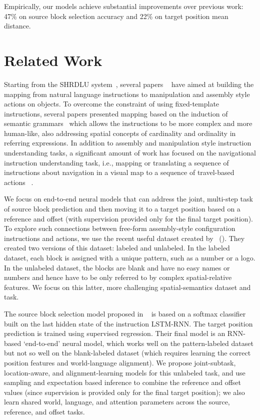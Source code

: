 \documentclass[letterpaper]{article} %
\newcommand{\newcite}[1]{\citeauthor{#1} (\citeyear{#1})}
\begin{document}
Empirically, our models achieve substantial improvements over previous work: 47\% on source block selection accuracy and 22\% on target position mean distance.

\section{Related Work}


Starting from the SHRDLU system~\cite{winograd72}, several papers ~\cite{branavan2009reinforcement,howard2014natural,matuszek2014learning} have aimed at building the mapping from natural language instructions to manipulation and assembly style actions on objects.
To overcome the constraint of using fixed-template instructions, several papers presented mapping based on the induction of semantic grammars~\cite{zettlemoyer2005learning,tellex2011understanding,matuszek2012joint,misra2015environment,paul2016efficient} which allows the instructions to be more complex and more human-like, also addressing spatial concepts of cardinality and ordinality in referring expressions.
%
In addition to assembly and manipulation style instruction understanding tasks, a significant amount of work has focused on the navigational instruction understanding task, i.e., mapping or translating a sequence of instructions about navigation in a visual map to a sequence of travel-based actions~\cite{chen2011learning,artzi2013weakly,mei2015listen,andreas2015alignment} .

We focus on end-to-end neural models that can address the joint, multi-step task of source block prediction and then moving it to a target position based on a reference and offset (with supervision provided only for the final target position). To explore such connections between free-form assembly-style configuration instructions and  actions, we use the recent useful dataset created by~\newcite{bisk2016natural}. They created two versions of this dataset: labeled and unlabeled. In the labeled dataset, each block is assigned with a unique pattern, such as a number or a logo. In the unlabeled dataset, the blocks are blank and have no easy names or numbers and hence have to be only referred to by complex spatial-relative features. We focus on this latter, more challenging spatial-semantics dataset and task.

The source block selection model proposed in ~\cite{bisk2016natural} is based on a softmax classifier built on the last hidden state of the instruction LSTM-RNN. The target position prediction is trained using supervised regression.  Their final model is an RNN-based `end-to-end' neural model, which works well on the pattern-labeled dataset but not so well on the blank-labeled dataset (which requires learning the correct position features and world-language alignment). We propose joint-subtask, location-aware, and alignment-learning models for this unlabeled task, and use sampling and expectation based inference to combine the reference and offset values (since supervision is provided only for the final target position); we also learn shared world, language, and attention parameters across the source, reference, and offset tasks.
\end{document}
